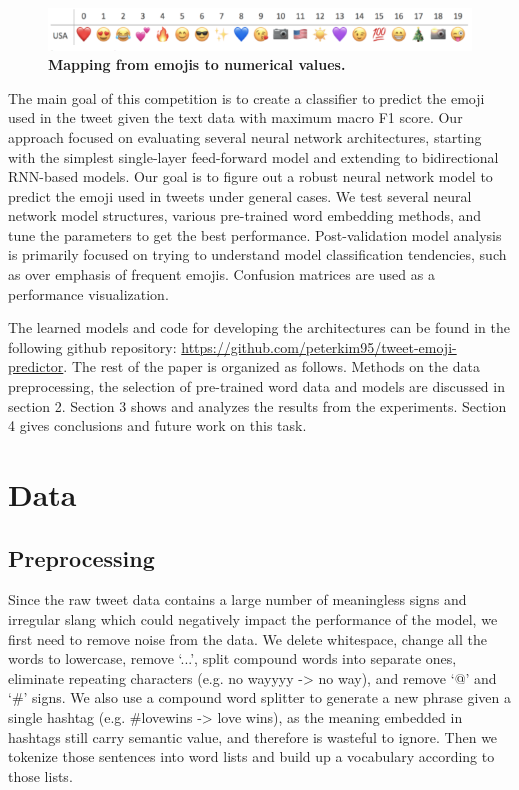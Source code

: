 \documentclass[11pt,a4paper]{article}
\begin{document}
	
	\begin{figure}[H]
		\centering\includegraphics[scale=0.36]{emojis} 
		\caption{\textbf{ Mapping from emojis to numerical values.}}
	\end{figure}
	
	
	The main goal of this competition is to create a classifier to predict the emoji used in the tweet given the text data with maximum macro F1 score. Our approach focused on evaluating several neural network architectures, starting with the simplest single-layer feed-forward model and extending to bidirectional RNN-based models. Our goal is to figure out a robust neural network model to predict the emoji used in tweets under general cases. We test several neural network model structures, various pre-trained word embedding methods, and tune the parameters to get the best performance. Post-validation model analysis is primarily focused on trying to understand model classification tendencies, such as over emphasis of frequent emojis. Confusion matrices are used as a performance visualization. 
	\par
	The learned models and code for developing the architectures can be found in the following github repository: \url{https://github.com/peterkim95/tweet-emoji-predictor}.  The rest of the paper is organized as follows. Methods on the data preprocessing, the selection of pre-trained word data and models are discussed in section 2. Section 3 shows and analyzes the results from the experiments. Section 4 gives conclusions and future work on this task.
	
	\section{Data}
	\subsection{Preprocessing}
	Since the raw tweet data contains a large number of meaningless signs and irregular slang which could negatively impact the performance of the model, we first need to remove noise from the data. We delete whitespace, change all the words to lowercase, remove ‘...’, split compound words into separate ones, eliminate repeating characters (e.g. no wayyyy -> no way), and remove ‘@’ and ‘\#’ signs. We also use a compound word splitter to generate a new phrase given a single hashtag (e.g. \#lovewins -> love wins), as the meaning embedded in hashtags still carry semantic value, and therefore is wasteful to ignore. Then we tokenize those sentences into word lists and build up a vocabulary according to those lists.
	
\end{document}
